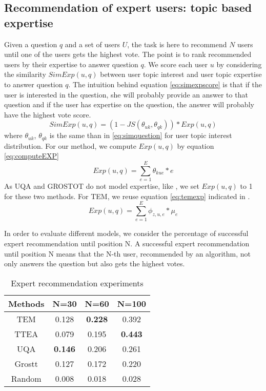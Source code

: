 {{{{{{{%



\subsection{Recommendation of expert users: topic based expertise}
Given a question $q$ and a set of users $U$, the task is here to recommend $N$ users until one of the users gets the highest vote. The point is to rank recommended users by their expertise to answer question $q$.
We score each user $u$ by considering the similarity $SimExp(u,q)$ between user topic interest and user topic expertise to answer question $q$. The intuition behind equation \ref{eq:simexpscore} is that if the user is interested in the question, she will probably provide an answer to that question and if the user has expertise on the question, the answer will probably have the highest vote score. 
\begin{equation}
SimExp(u,q) = (1 -JS(\theta_{uk},\theta_{qk}))* Exp(u,q)
\label{eq:simexpscore}
\end{equation}
where $\theta_{uk}$, $\theta_{qk}$ is the same than in \ref{eq:simquestion} for user topic interest distribution. For our method, we compute $Exp(u,q)$ by equation \ref{eq:computeEXP}
\begin{equation}
Exp(u,q) =  \sum_{e=1}^{E} \theta_{kue} * e
\label{eq:computeEXP}
\end{equation}
As UQA and GROSTOT do not model expertise, like \cite{yang2013cqarank}, we set $Exp(u,q)$ to 1 for these two methods. For TEM, we reuse equation \ref{eq:temexp} indicated in \cite{yang2013cqarank}.
\begin{equation}
Exp(u,q) =  \sum_{e=1}^{E} \phi_{z,u,e}* \mu_e
\label{eq:temexp}
\end{equation}


In order to evaluate different models, we consider the percentage of successful expert recommendation until position N. A successful expert recommendation until position N means that the N-th user, recommended by an algorithm, not only answers the question but also gets the highest votes. 


\begin{table}[htp]
\caption{Expert recommendation experiments}
\label{tab:expertrec}
\centering
\begin{tabular}{|c|c|c|c|}
\hline
Methods& N=30 & N=60 & N=100 \\ \hline
TEM&0.128&\textbf{0.228}&0.392 \\ \hline
TTEA&0.079&0.195&\textbf{0.443} \\ \hline
UQA&\textbf{0.146}&0.206&0.261 \\ \hline
Grostt&0.127&0.172&0.220 \\ \hline
Random&0.008&0.018&0.028 \\ \hline
\end{tabular}
\end{table}

}}}}}}}
